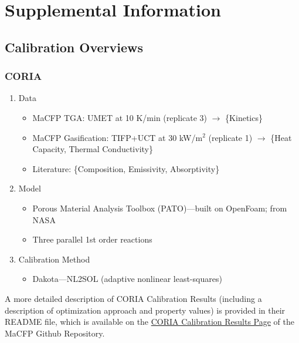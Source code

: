 \documentclass{article}
\begin{document}
\section{Supplemental Information}
\label{sec:SI}
\subsection{Calibration Overviews}
\subsubsection*{CORIA}
\begin{enumerate}
	\item Data
	\begin{itemize}
		\item MaCFP TGA: UMET at 10 K/min (replicate 3) $\rightarrow$ \{Kinetics\}
		\item MaCFP Gasification: TIFP+UCT at 30 kW/m$^2$ (replicate 1) $\rightarrow$ \{Heat Capacity, Thermal Conductivity\}
		\item Literature: \{Composition, Emissivity, Absorptivity\}
	\end{itemize}
	
	\item Model
	\begin{itemize}
		\item Porous Material Analysis Toolbox (PATO)---built on OpenFoam; from NASA
		\item Three parallel 1st order reactions
	\end{itemize}
	
	\item Calibration Method
	\begin{itemize}
		\item Dakota---NL2SOL (adaptive nonlinear least-squares)
	\end{itemize}
\end{enumerate}
A more detailed description of CORIA Calibration Results (including a description of optimization approach and property values) is provided in their README file, which is available on the \href{https://github.com/MaCFP/matl-db/blob/master/Wood/Calibration_Results/CORIA/README.md}{CORIA Calibration Results Page} of the MaCFP Github Repository.
\end{document}
